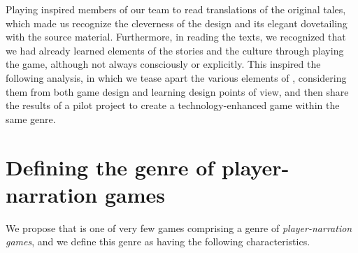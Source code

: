 \documentclass[a4paper]{article}
\begin{document}
Playing \totan{}  inspired members of our team to read translations
of the original tales, which made us recognize the cleverness of the design
and its elegant dovetailing with the source material.
Furthermore, in reading the texts, we recognized that we had already
learned elements of the stories and the culture through playing the game,
although not always consciously or explicitly.
This inspired the following analysis, in which we tease apart the
various elements of \totan{}, considering them from both game design
and learning design points of view, and then share the results of a pilot
project to create a technology-enhanced game within the same genre.

\section{Defining the genre of player-narration games}

We propose that \totan{} is one of very few games comprising a genre
of \textit{player-narration games}, and we define this genre as having
the following characteristics.
\end{document}
